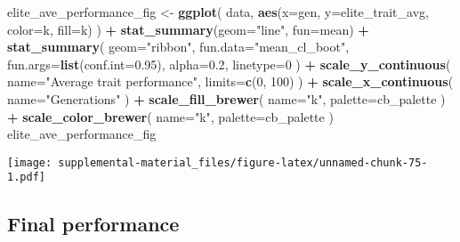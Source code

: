 \documentclass[]{book}
\newenvironment{Shaded}{\begin{snugshade}}{\end{snugshade}}
\newcommand{\DataTypeTok}[1]{\textcolor[rgb]{0.13,0.29,0.53}{#1}}
\newcommand{\DecValTok}[1]{\textcolor[rgb]{0.00,0.00,0.81}{#1}}
\newcommand{\FloatTok}[1]{\textcolor[rgb]{0.00,0.00,0.81}{#1}}
\newcommand{\KeywordTok}[1]{\textcolor[rgb]{0.13,0.29,0.53}{\textbf{#1}}}
\newcommand{\NormalTok}[1]{#1}
\newcommand{\OperatorTok}[1]{\textcolor[rgb]{0.81,0.36,0.00}{\textbf{#1}}}
\newcommand{\StringTok}[1]{\textcolor[rgb]{0.31,0.60,0.02}{#1}}
\begin{document}
\begin{Shaded}
\begin{Highlighting}[]
\NormalTok{elite_ave_performance_fig <-}
\StringTok{  }\KeywordTok{ggplot}\NormalTok{(}
\NormalTok{    data,}
    \KeywordTok{aes}\NormalTok{(}\DataTypeTok{x=}\NormalTok{gen, }\DataTypeTok{y=}\NormalTok{elite_trait_avg, }\DataTypeTok{color=}\NormalTok{k, }\DataTypeTok{fill=}\NormalTok{k)}
\NormalTok{  ) }\OperatorTok{+}
\StringTok{  }\KeywordTok{stat_summary}\NormalTok{(}\DataTypeTok{geom=}\StringTok{"line"}\NormalTok{, }\DataTypeTok{fun=}\NormalTok{mean) }\OperatorTok{+}
\StringTok{  }\KeywordTok{stat_summary}\NormalTok{(}
    \DataTypeTok{geom=}\StringTok{"ribbon"}\NormalTok{,}
    \DataTypeTok{fun.data=}\StringTok{"mean_cl_boot"}\NormalTok{,}
    \DataTypeTok{fun.args=}\KeywordTok{list}\NormalTok{(}\DataTypeTok{conf.int=}\FloatTok{0.95}\NormalTok{),}
    \DataTypeTok{alpha=}\FloatTok{0.2}\NormalTok{,}
    \DataTypeTok{linetype=}\DecValTok{0}
\NormalTok{  ) }\OperatorTok{+}
\StringTok{  }\KeywordTok{scale_y_continuous}\NormalTok{(}
    \DataTypeTok{name=}\StringTok{"Average trait performance"}\NormalTok{,}
    \DataTypeTok{limits=}\KeywordTok{c}\NormalTok{(}\DecValTok{0}\NormalTok{, }\DecValTok{100}\NormalTok{)}
\NormalTok{  ) }\OperatorTok{+}
\StringTok{  }\KeywordTok{scale_x_continuous}\NormalTok{(}
    \DataTypeTok{name=}\StringTok{"Generations"}
\NormalTok{  ) }\OperatorTok{+}
\StringTok{  }\KeywordTok{scale_fill_brewer}\NormalTok{(}
    \DataTypeTok{name=}\StringTok{"k"}\NormalTok{,}
    \DataTypeTok{palette=}\NormalTok{cb_palette}
\NormalTok{  ) }\OperatorTok{+}
\StringTok{  }\KeywordTok{scale_color_brewer}\NormalTok{(}
    \DataTypeTok{name=}\StringTok{"k"}\NormalTok{,}
    \DataTypeTok{palette=}\NormalTok{cb_palette}
\NormalTok{  )}
\NormalTok{elite_ave_performance_fig}
\end{Highlighting}
\end{Shaded}

\texttt{[image: supplemental-material\_files/figure-latex/unnamed-chunk-75-1.pdf]}

\hypertarget{final-performance-7}{%
\subsection{Final performance}\label{final-performance-7}}
\end{document}
